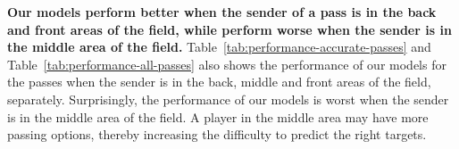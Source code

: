 \textbf{Our models perform better when the sender of a pass is in the back and front areas of the field, while perform worse when the sender is in the middle area of the field.}
Table~\ref{tab:performance-accurate-passes} and Table~\ref{tab:performance-all-passes} also shows the performance of our models for the passes when the sender is in the back, middle and front areas of the field, separately.
Surprisingly, the performance of our models is worst when the sender is in the middle area of the field. A player in the middle area may have more passing options, thereby increasing the difficulty to predict the right targets.